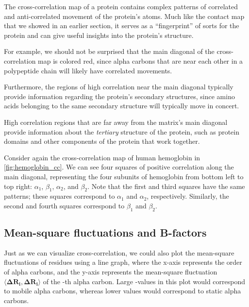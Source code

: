 The cross-correlation map of a protein contains complex patterns of correlated and anti-correlated movement of the protein's atoms. Much like the contact map that we showed in an earlier section, it serves as a ``fingerprint'' of sorts for the protein and can give useful insights into the protein's structure.

For example, we should not be surprised that the main diagonal of the cross-correlation map is colored red, since alpha carbons that are near each other in a polypeptide chain will likely have correlated movements.

Furthermore, the regions of high correlation near the main diagonal typically provide information regarding the protein's secondary structures, since amino acids belonging to the same secondary structure will typically move in concert.

High correlation regions that are far away from the matrix's main diagonal provide information about the \textit{tertiary} structure of the protein, such as protein domains and other components of the protein that work together.

Consider again the cross-correlation map of human hemoglobin in \autoref{fig:hemoglobin_cc}. We can see four squares of positive correlation along the main diagonal, representing the four subunits of hemoglobin from bottom left to top right: $\alpha_1$, $\beta_1$, $\alpha_2$, and $\beta_2$. Note that the first and third squares have the same patterns; these squares correspond to $\alpha_1$ and $\alpha_2$, respectively. Similarly, the second and fourth squares correspond to $\beta_1$ and $\beta_2$.\\

\begin{qbox}\end{qbox}

\FloatBarrier
{}
\subsection{Mean-square fluctuations and B-factors}

Just as we can visualize cross-correlation, we could also plot the mean-square fluctuations of residues using a line graph, where the x-axis represents the order of alpha carbons, and the y-axis represents the mean-square fluctuation $ \langle \mathbf{\Delta R_i}, \mathbf{\Delta R_i} \rangle $ of the -th alpha carbon. Large -values in this plot would correspond to mobile alpha carbons, whereas lower values would correspond to static alpha carbons.

